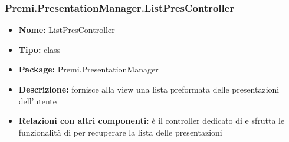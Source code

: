 \subsubsection{Premi.PresentationManager.ListPresController}
\begin{itemize}
  \item \textbf{Nome:} ListPresController
  \item \textbf{Tipo:} class
  \item \textbf{Package:} Premi.PresentationManager
  \item \textbf{Descrizione:} fornisce alla view una lista preformata delle presentazioni dell'utente
  \item \textbf{Relazioni con altri componenti:} è il controller dedicato di   e sfrutta le funzionalità di  per recuperare la lista delle presentazioni
\end{itemize}



\clearpage
